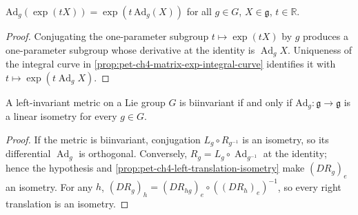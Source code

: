 \begin{proposition}
  \label{prop:pet-ch4-adjoint-exp-relation}


  $\mathrm{Ad}_g(\exp(tX))=\exp(t\,\mathrm{Ad}_g(X))$ for all $g\in G$, $X\in\mathfrak g$, $t\in\mathbb{R}$.
\end{proposition}
\begin{proof}

  \sketch
  Conjugating the one-parameter subgroup $t\mapsto\exp(tX)$ by $g$ produces a
  one-parameter subgroup whose derivative at the identity is
  $\operatorname{Ad}_gX$. Uniqueness of the integral curve in
  \cref{prop:pet-ch4-matrix-exp-integral-curve} identifies it with
  $t\mapsto\exp(t\operatorname{Ad}_gX)$.
\end{proof}

\begin{proposition}
  \label{prop:pet-ch4-biinvariant-criterion}

  A left-invariant metric on a Lie group $G$ is biinvariant if and only if
  $\mathrm{Ad}_g:\mathfrak g\to\mathfrak g$ is a linear isometry for every $g\in G$.
\end{proposition}
\begin{proof}
  \sketch
  If the metric is biinvariant, conjugation $L_g\circ R_{g^{-1}}$ is an
  isometry, so its differential $\operatorname{Ad}_g$ is orthogonal. Conversely,
  $R_g=L_g\circ\operatorname{Ad}_{g^{-1}}$ at the identity; hence the hypothesis
  and \cref{prop:pet-ch4-left-translation-isometry} make $(DR_g)_e$ an
  isometry. For any $h$,
  $(DR_g)_h=(DR_{hg})_e\circ((DR_h)_e)^{-1}$, so every right translation is an
  isometry.
\end{proof}


